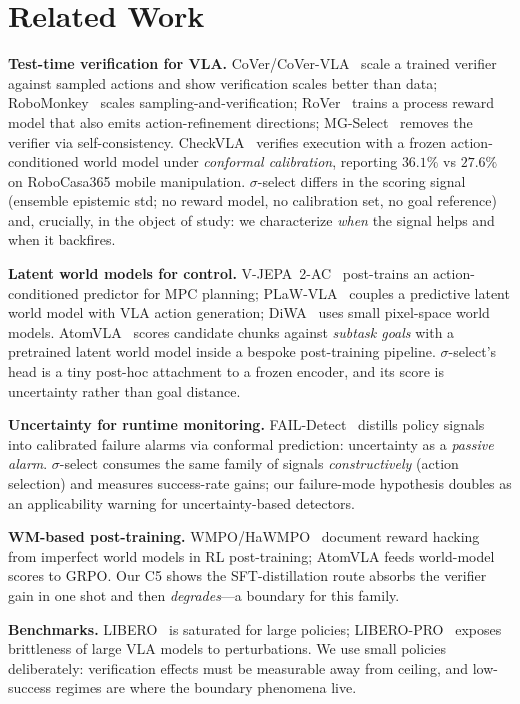 \documentclass[11pt]{article}
\begin{document}
\section{Related Work}
\textbf{Test-time verification for VLA.} CoVer/CoVer-VLA~\citep{cover2026} scale a trained verifier against sampled actions and show verification scales better than data; RoboMonkey~\citep{robomonkey2025} scales sampling-and-verification; RoVer~\citep{rover2025} trains a process reward model that also emits action-refinement directions; MG-Select~\citep{mgselect2025} removes the verifier via self-consistency. CheckVLA~\citep{checkvla2026} verifies execution with a frozen action-conditioned world model under \emph{conformal calibration}, reporting $36.1\%$ vs $27.6\%$ on RoboCasa365 mobile manipulation. $\sigma$-select differs in the scoring signal (ensemble epistemic std; no reward model, no calibration set, no goal reference) and, crucially, in the object of study: we characterize \emph{when} the signal helps and when it backfires.

\textbf{Latent world models for control.} V-JEPA~2-AC~\citep{vjepa2_2025} post-trains an action-conditioned predictor for MPC planning; PLaW-VLA~\citep{plawvla2025} couples a predictive latent world model with VLA action generation; DiWA~\citep{diwa2025} uses small pixel-space world models. AtomVLA~\citep{atomvla2026} scores candidate chunks against \emph{subtask goals} with a pretrained latent world model inside a bespoke post-training pipeline. $\sigma$-select's head is a tiny post-hoc attachment to a frozen encoder, and its score is uncertainty rather than goal distance.

\textbf{Uncertainty for runtime monitoring.} FAIL-Detect~\citep{faildetect2025} distills policy signals into calibrated failure alarms via conformal prediction: uncertainty as a \emph{passive alarm}. $\sigma$-select consumes the same family of signals \emph{constructively} (action selection) and measures success-rate gains; our failure-mode hypothesis doubles as an applicability warning for uncertainty-based detectors.

\textbf{WM-based post-training.} WMPO/HaWMPO~\citep{hawmpo2026} document reward hacking from imperfect world models in RL post-training; AtomVLA feeds world-model scores to GRPO. Our C5 shows the SFT-distillation route absorbs the verifier gain in one shot and then \emph{degrades}---a boundary for this family.

\textbf{Benchmarks.} LIBERO~\citep{libero2023} is saturated for large policies; LIBERO-PRO~\citep{liberopro2025} exposes brittleness of large VLA models to perturbations. We use small policies deliberately: verification effects must be measurable away from ceiling, and low-success regimes are where the boundary phenomena live.
\end{document}
